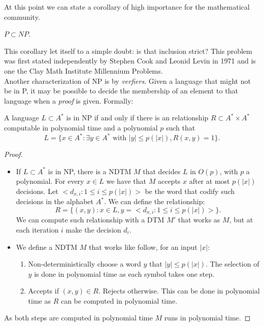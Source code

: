 At this point we can state a corollary of high importance for the mathematical community.

\begin{corollary}
  $P \subset NP$.
\end{corollary}

This corollary let itself to a simple doubt: is that inclusion strict? This problem was first stated independently by Stephen Cook and  Leonid Levin in 1971\cite{cook2006p} and is one the Clay Math Institute Millennium Problems.\\

Another characterization of NP is by \emph{verfiers}. Given a language that might not be in P, it may be possible to decide the membership of an element to that language when a \emph{proof} is given. Formally:

\begin{proposition}
  A language $L\subset A^*$ is in NP if and only if there is an relationship $R\subset A^*\times A^*$  computable in polynomial time and a polynomial $p$ such that
  $$L = \{x \in A^*:\exists y \in A^* \text{ with } |y | \le p(|x|), R(x, y) = 1\}.$$
\end{proposition}
\begin{proof}\hfill
\begin{itemize}
\item[\fbox{$\Rightarrow$}] If $L\subset A^*$ is in NP, there is a NDTM $M$ that decides $L$ in $O(p)$, with $p$ a polynomial. For every $x\in L$ we have that $M$ accepts $x$ after at most $p(|x|)$ decisions. Let $<d_{x,i} : 1 \le i \le p(|x|)>$ be the word that codify such decisions in the alphabet $A^*$. We can define the relationship:
  $$R = \{(x,y)  : x \in L, y = <d_{x,i} : 1 \le i \le p(|x|)>\}.$$
  We can compute such relationship with a DTM $M'$ that works as $M$, but at each iteration $i$ make the decision $d_i$. 
\item[\fbox{$\Leftarrow$}] We define a NDTM $M$ that works like follow, for an input $|x|$:
  \begin{enumerate}
  \item Non-deterministically choose a word $y$ that $|y|\le p(|x|)$. The selection of $y$ is done in polynomial time as each symbol takes one step.
  \item Accepts if $(x,y)\in R$. Rejects otherwise. This can be done in polynomial time as $R$ can be computed in polynomial time.
    \end{enumerate}
  \end{itemize}
  As both steps are computed in polynomial time $M$ runs in polynomial time.  
\end{proof}

